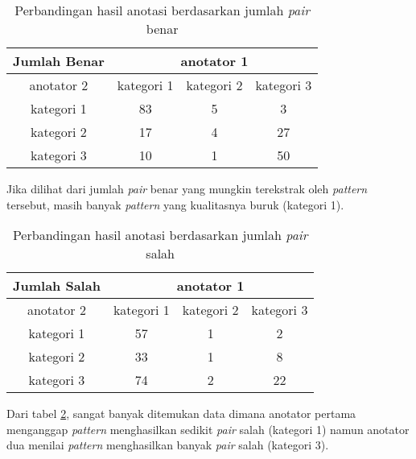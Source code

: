 \begin{table}
  \centering
  \caption{Perbandingan hasil anotasi berdasarkan jumlah \textit{pair} benar}
  \label{table:p-anotasi-benar}
  \begin{tabular}{|c|c|c|c|}
  \hline
  Jumlah Benar & \multicolumn{3}{c|}{ anotator 1 } \\ \hline
  anotator 2 & kategori 1 & kategori 2 & kategori 3 \\ \hline
  kategori 1 & 83 & 5 & 3 \\ \hline
  kategori 2 & 17 & 4 & 27 \\ \hline
  kategori 3 & 10 & 1 & 50 \\ \hline
  \end{tabular} 
\end{table}

\noindent Jika dilihat dari jumlah \textit{pair} benar yang mungkin terekstrak oleh \textit{pattern} tersebut, masih banyak \textit{pattern} yang kualitasnya buruk (kategori 1).

\begin{table}
  \centering
  \caption{Perbandingan hasil anotasi berdasarkan jumlah \textit{pair} salah}
  \label{table:p-anotasi-salah}
  \begin{tabular}{|c|c|c|c|}
  \hline
  Jumlah Salah & \multicolumn{3}{c|}{ anotator 1 } \\ \hline
  anotator 2 & kategori 1 & kategori 2 & kategori 3 \\ \hline
  kategori 1 & 57 & 1 & 2 \\ \hline
  kategori 2 & 33 & 1 & 8 \\ \hline
  kategori 3 & 74 & 2 & 22 \\ \hline
  \end{tabular} 
\end{table}

Dari tabel \ref{table:p-anotasi-salah}, sangat banyak ditemukan data dimana anotator pertama menganggap \textit{pattern} menghasilkan sedikit \textit{pair} salah (kategori 1) namun anotator dua menilai \textit{pattern} menghasilkan banyak \textit{pair} salah (kategori 3).

